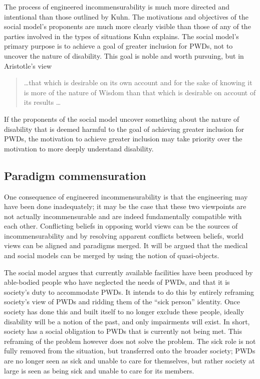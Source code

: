 \documentclass[a4paper]{article}
\begin{document}
The process of engineered incommensurability is much more directed and
intentional than those outlined by Kuhn. The motivations and objectives of the
social model's proponents are much more clearly visible than those of any of
the parties involved in the types of situations Kuhn explains. The social
model's primary purpose is to achieve a goal of greater inclusion for PWDs,
not to uncover the nature of disability. This goal is noble and worth
pursuing, but in Aristotle's view
%
\begin{quote}
    \ldots that which is desirable on its own account and for the sake of
    knowing it is more of the nature of Wisdom than that which is desirable on
    account of its results \ldots
\end{quote}
%
If the proponents of the social model uncover something about the nature of
disability that is deemed harmful to the goal of achieving greater inclusion
for PWDs, the motivation to achieve greater inclusion may take priority over
the motivation to more deeply understand disability.

\subsection{Paradigm commensuration}

One consequence of engineered incommensurability is that the engineering may
have been done inadequately; it may be the case that these two viewpoints are
not actually incommensurable and are indeed fundamentally compatible with each
other. Conflicting beliefs in opposing world views can be the sources of
incommensurability and by resolving apparent conflicts between beliefs, world
views can be aligned and paradigms merged. It will be argued that the medical
and social models can be merged by using the notion of quasi-objects.

The social model argues that currently available facilities have been produced
by able-bodied people who have neglected the needs of PWDs, and that it is
society's duty to accommodate PWDs. It intends to do this by entirely
reframing society's view of PWDs and ridding them of the ``sick person''
identity. Once society has done this and built itself to no longer exclude
these people, ideally disability will be a notion of the past, and only
impairments will exist. In short, society has a social obligation to PWDs that
is currently not being met. This reframing of the problem however does not
solve the problem. The sick role is not fully removed from the situation, but
transferred onto the broader society; PWDs are no longer seen as sick and
unable to care for themselves, but rather society at large is seen as being
sick and unable to care for its members.
\end{document}
